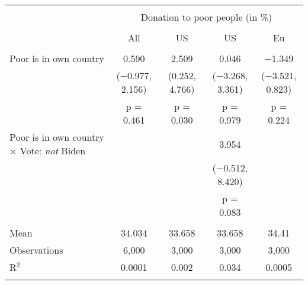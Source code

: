 
\begin{tabular}{@{\extracolsep{5pt}}lcccc} 
\\[-1.8ex]\hline 
\hline \\[-1.8ex] 
 & \multicolumn{4}{c}{Donation to poor people (in \%)} \\ 
\cline{2-5} 
\\[-1.8ex] & All & US & US & Eu \\ 
\hline \\[-1.8ex] 
 Poor is in own country & 0.590 & 2.509 & 0.046 & $-$1.349 \\ 
  & ($-$0.977, 2.156) & (0.252, 4.766) & ($-$3.268, 3.361) & ($-$3.521, 0.823) \\ 
  & p = 0.461 & p = 0.030 & p = 0.979 & p = 0.224 \\ 
  Poor is in own country $\times$ Vote: \textit{not} Biden &  &  & 3.954 &  \\ 
  &  &  & ($-$0.512, 8.420) &  \\ 
  &  &  & p = 0.083 &  \\ 
 \hline \\[-1.8ex] 
Mean & 34.034 & 33.658 & 33.658 & 34.41 \\ 
Observations & 6,000 & 3,000 & 3,000 & 3,000 \\ 
R$^{2}$ & 0.0001 & 0.002 & 0.034 & 0.0005 \\ 
\hline 
\hline \\[-1.8ex] 
\end{tabular} 